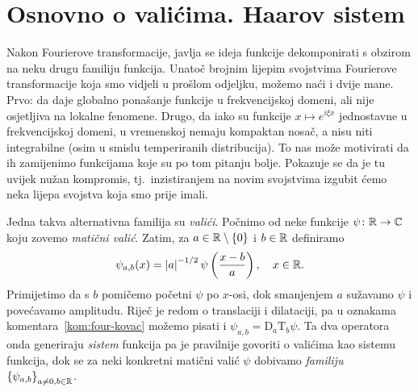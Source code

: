 \documentclass[main.tex]{subfiles}
\newcommand{\mr}[1]{\mathrm{#1}}
\begin{document}
\section{Osnovno o valićima. Haarov sistem}\label{sec:val1}
Nakon Fourierove transformacije, javlja se ideja funkcije dekomponirati
s obzirom na neku drugu familiju funkcija. Unatoč brojnim lijepim svojstvima
Fourierove transformacije koja smo vidjeli u prošlom odjeljku, možemo naći i dvije
mane. Prvo: da daje globalno ponašanje funkcije u frekvencijskoj domeni, ali
nije osjetljiva na lokalne fenomene. Drugo, da iako su funkcije
\( x \mapsto e^{i\xi x} \) jednostavne u frekvencijskoj domeni,
u vremenskoj nemaju kompaktan nosač, a nisu niti integrabilne (osim u smislu temperiranih distribucija).
To nas može motivirati da ih zamijenimo funkcijama koje su po tom pitanju bolje.
Pokazuje se da je tu uvijek nužan kompromis, tj.\ inzistiranjem na novim svojstvima
izgubit ćemo neka lijepa svojstva koja smo prije imali.

Jedna takva alternativna familija su \emph{valići}.
Počnimo od neke funkcije \( \psi \colon \mathbb{R} \to \mathbb{C} \)
koju zovemo \emph{matični valić}.
Zatim, za \( a \in \mathbb{R} \setminus \left\{ 0 \right\} \)
i \( b \in \mathbb{R} \) definiramo
\begin{equation}
	\psi_{a,b}(x) = \left| {a} \right|^{-1/2} \psi \left( \frac {x-b}a \right), \quad x \in \mathbb{R}.
\end{equation}
Primijetimo da s \( b \) pomičemo početni \( \psi \) po \( x \)-osi, dok smanjenjem \( a \)
sužavamo \( \psi \) i povećavamo amplitudu. Riječ je redom o translaciji i dilataciji,
pa u oznakama komentara~\ref{kom:four-kovac} možemo pisati i
\( \psi_{a,b} = \mr D_a \mr T_b \psi \). Ta dva operatora onda generiraju
\emph{sistem} funkcija pa je pravilnije govoriti o valićima kao sistemu funkcija,
dok se za neki konkretni matični valić \( \psi \) dobivamo \emph{familiju} \( \left\{ \psi_{a,b} \right\}_{a\neq 0, b \in \mathbb{R}} \).
\end{document}
